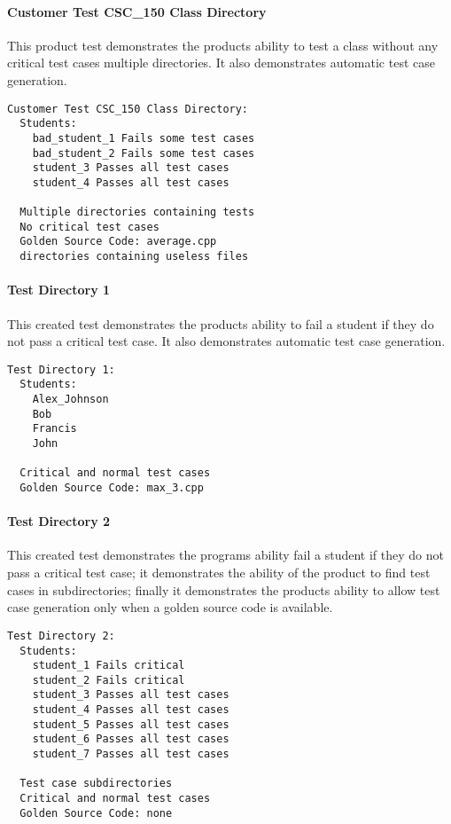 \paragraph{Customer Test CSC\_150 Class Directory}
This product test demonstrates the products ability to test a class without any critical test cases multiple directories. It also demonstrates automatic test case generation.
\begin{verbatim}
Customer Test CSC_150 Class Directory:
  Students:
    bad_student_1 Fails some test cases
    bad_student_2 Fails some test cases
    student_3 Passes all test cases
    student_4 Passes all test cases
    
  Multiple directories containing tests
  No critical test cases
  Golden Source Code: average.cpp
  directories containing useless files
\end{verbatim}

\paragraph{Test Directory 1}
This created test demonstrates the products ability to fail a student if they do not pass a critical test case. It also demonstrates automatic test case generation.
\begin{verbatim}
Test Directory 1:
  Students:
    Alex_Johnson
    Bob
    Francis
    John
    
  Critical and normal test cases
  Golden Source Code: max_3.cpp
\end{verbatim}

\paragraph{Test Directory 2}
This created test demonstrates the programs ability fail a student if they do not pass a critical test case; it demonstrates the ability of the product to find test cases in subdirectories; finally it demonstrates the products ability to allow test case generation only when a golden source code is available.
\begin{verbatim}
Test Directory 2:
  Students:
    student_1 Fails critical
    student_2 Fails critical
    student_3 Passes all test cases
    student_4 Passes all test cases
    student_5 Passes all test cases
    student_6 Passes all test cases
    student_7 Passes all test cases

  Test case subdirectories
  Critical and normal test cases
  Golden Source Code: none
\end{verbatim}


